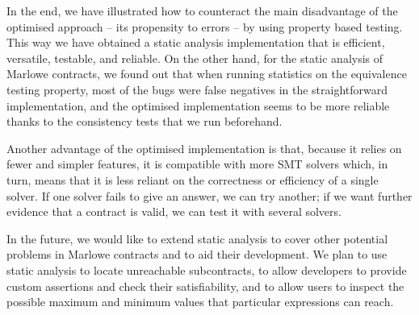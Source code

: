 \documentclass[english,runningheads]{llncs}
\begin{document}
In the end, we have illustrated how to counteract the main disadvantage
of the optimised approach -- its propensity to errors -- by using property
based testing. This way we have obtained a static analysis implementation
that is efficient, versatile, testable, and reliable. 
On the other hand, for the static analysis of Marlowe contracts, we
found out that when running statistics on the equivalence testing
property, most of the bugs were false negatives in the straightforward
implementation, and the optimised implementation seems to be more
reliable thanks to the consistency tests that we run beforehand.

Another advantage of the optimised implementation is that, because
it relies on fewer and simpler features, it is compatible with more
SMT solvers which, in turn, means that it is less reliant on the
correctness or efficiency of a single solver. If one solver fails to give
an answer, we can try another; if we want further evidence that a
contract is valid, we can test it with several solvers.

In the future, we would like to extend static analysis to cover other
potential problems in Marlowe contracts and to aid their development.
We plan to use static analysis to locate unreachable
subcontracts, to allow developers to provide custom assertions and
check their satisfiability, and to allow users to inspect the
possible maximum and minimum values that particular expressions can
reach. 




\end{document}
